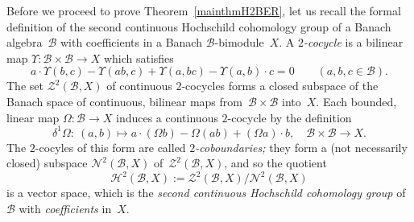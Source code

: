 \documentclass[11pt,reqno]{amsart}
\theoremstyle{definition}
\numberwithin{equation}{section}
\begin{document}
Before we proceed to prove Theorem~\ref{mainthmH2BER}, let us recall
the formal definition of the second continuous Hochschild cohomology
group of a Banach algebra~$\mathscr{B}$ with coefficients in a Banach
$\mathscr{B}$\nobreakdash-bi\-module~$X$.  A \emph{$2$-cocycle} is a
bilinear map $\Upsilon\colon\mathscr{B}\times\mathscr{B}\to X$ which
satisfies
\[ a\cdot \Upsilon(b,c) - \Upsilon(ab,c) + \Upsilon(a,bc) - 
\Upsilon(a,b)\cdot c = 0\qquad (a,b,c\in\mathscr{B}). \] The set
$\mathscr{Z}^2(\mathscr{B}, X)$ of continuous $2$-cocycles forms a
closed subspace of the Banach space of continuous, bilinear maps
from~$\mathscr{B}\times\mathscr{B}$ into~$X$.  Each bounded, linear
map $\Omega\colon\mathscr{B}\to X$ induces a continuous $2$-cocycle by
the definition
\begin{equation}\label{coboundDefn}
\delta^1\Omega\colon\ (a,b)\mapsto a\cdot (\Omega b) -
\Omega(ab) + (\Omega a)\cdot b,\quad
\mathscr{B}\times\mathscr{B}\to X. \end{equation}
The $2$-cocyles of this form are called \emph{$2$-coboundaries;}
they form a (not necessarily closed) subspace
$\mathscr{N}^2(\mathscr{B}, X)$ of~$\mathscr{Z}^2(\mathscr{B}, X)$,
and so the quotient
\[ \mathscr{H}^2(\mathscr{B}, X) := 
\mathscr{Z}^2(\mathscr{B}, X)/\mathscr{N}^2(\mathscr{B}, X) \] is a
vector space, which is the \emph{second continuous Hochschild
  cohomology group} of~$\mathscr{B}$ with \emph{coefficients} in~$X$.
\end{document}
